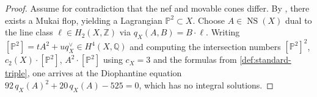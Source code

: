 \begin{proof}
  Assume for contradiction that the nef and movable cones differ.  By
  \cite[Theorem~1.1]{wiwi}, there exists a Mukai flop, yielding a Lagrangian
  \(\mathbb{P}^2 \subset X\).  Choose \(A \in \operatorname{NS}(X)\) dual to the line
  class \(\ell \in H_2(X, \mathbb{Z})\) via \(q_X(A, B) = B \cdot \ell\).  Writing
  \([\mathbb{P}^2] = tA^2 + u q_X^\vee \in H^4(X, \mathbb{Q})\) and computing the
  intersection numbers \([\mathbb{P}^2]^2\), \(c_2(X) \cdot [\mathbb{P}^2]\),
  \(A^2 \cdot [\mathbb{P}^2]\) using \(c_X = 3\) and the formulas from
  \cref{def:standard-triple}, one arrives at the Diophantine equation
  \(92\,q_X(A)^2 + 20\,q_X(A) - 525 = 0\), which has no integral solutions.
\end{proof}

